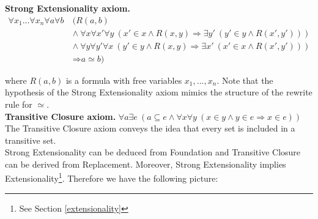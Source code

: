 \documentclass[submission,copyright,creativecommons]{eptcs}
\def\imp{\mathbin{\Rightarrow}}
\def\fa{{\forall}}
\def\conj{\mathbin{\wedge}}
\def\ex{{\exists}}
\begin{document}
\textbf{Strong Extensionality axiom.} 
\begin{equation*}
\begin{split}
\fa x_1...\fa x_n\fa a\fa b~ &(R(a, b) \\
&\conj~\fa x\fa x'\fa y~(x' \in x \conj R(x, y) \imp \ex y'~(y' \in y \conj R(x', y'))) \\
&\conj~\fa y\fa y'\fa x~(y' \in y \conj R(x, y) \imp \ex x'~(x' \in x \conj R(x', y'))) \\
&\imp a \simeq b) 
\end{split}
\end{equation*}

where $R(a,b)$ is a formula with free variables $x_1, ..., x_n$. Note that the hypothesis of the Strong Extensionality axiom mimics the structure of the rewrite rule for $\simeq$.
\\

\textbf{Transitive Closure axiom.} $\fa a\ex e~(a \subseteq e \conj \fa x\fa y~(x \in y \conj y \in e \imp x \in e))$ \\

The Transitive Closure axiom conveys the idea that every set is included in a transitive set. \\

Strong Extensionality can be deduced from Foundation and Transitive Closure can be derived from Replacement. Moreover, Strong Extensionality implies Extensionality\footnote{See Section \ref{extensionality}}. Therefore we have the following picture:

\end{document}

